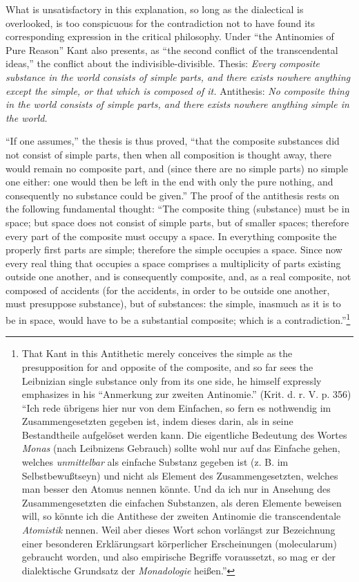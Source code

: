 \documentclass[12pt,a4paper,openany]{book}
\newcommand{\opage}[1]{\marginnote{\footnotesize\textit{[#1]}}}
\begin{document}
What is unsatisfactory in this explanation, so long as
the dialectical is overlooked, is too conspicuous for the contradiction
not to have found its corresponding expression in the critical
philosophy. Under ``the Antinomies of Pure Reason''
Kant also presents, as ``the second conflict of the transcendental ideas,''
the conflict about the indivisible-divisible. Thesis:
\emph{Every composite substance in the world consists
of simple parts, and there exists nowhere anything
except the simple, or that which is composed of it.}
Antithesis: \emph{No composite thing in the world
consists of simple parts, and there exists nowhere
anything simple in the world.}

``If one assumes,'' the thesis is thus proved, ``that the
composite substances did not consist of simple parts, then
when all composition is thought away, there would
\setcounter{footnote}{0}%
\opage{126}remain no composite part, and (since there are no simple parts)
no simple one either: one would then be left in the end with only the
pure nothing, and consequently no substance could be given.''
The proof of the antithesis rests on the following fundamental thought:
``The composite thing (substance) must be in space;
but space does not consist of simple parts, but of
smaller spaces; therefore every part of the composite must
occupy a space. In everything composite the properly first
parts are simple; therefore the simple occupies a space. Since
now every real thing that occupies a space comprises a multiplicity
of parts existing outside one another, and is consequently
composite, and, as a real composite, not composed of accidents
(for the accidents, in order to be outside one another, must presuppose
substance), but of substances: the
simple, inasmuch as it is to be in space, would have to be a substantial
composite; which is a contradiction.''\footnote[1]{That Kant in this Antithetic merely conceives the simple as the presupposition for and opposite of the composite, and so far sees the Leibnizian single substance only from its one side, he himself expressly emphasizes in his ``Anmerkung zur zweiten Antinomie.'' (Krit. d. r. V. p. 356) ``Ich rede übrigens hier nur von dem Einfachen, so fern es nothwendig im Zusammengesetzten gegeben ist, indem dieses darin, als in seine Bestandtheile aufgelöset werden kann. Die eigentliche Bedeutung des Wortes \emph{Monas} (nach Leibnizens Gebrauch) sollte wohl nur auf das Einfache gehen, welches \emph{unmittelbar} als einfache Substanz gegeben ist (z. B. im Selbstbewußtseyn) und nicht als Element des Zusammengesetzten, welches man besser den Atomus nennen könnte. Und da ich nur in Ansehung des Zusammengesetzten die einfachen Substanzen, als deren Elemente beweisen will, so könnte ich die Antithese der zweiten Antinomie die transcendentale \emph{Atomistik} nennen. Weil aber dieses Wort schon vorlängst zur Bezeichnung einer besonderen Erklärungsart körperlicher Erscheinungen (molecularum) gebraucht worden, und also empirische Begriffe voraussetzt, so mag er der dialektische Grundsatz der \emph{Monadologie} heißen.''}
\end{document}

